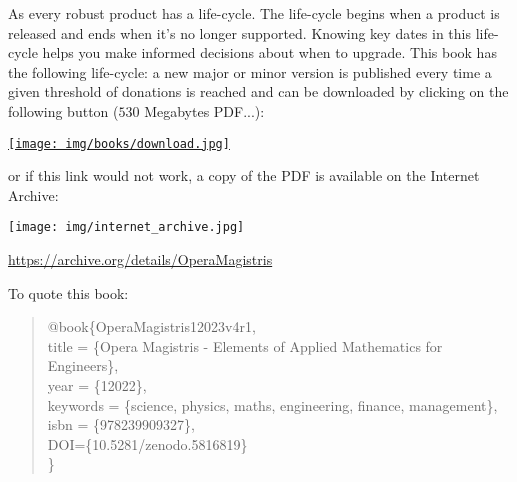 	As every robust product has a life-cycle. The life-cycle begins when a product is released and ends when it's no longer supported. Knowing key dates in this life-cycle helps you make informed decisions about when to upgrade. This book has the following life-cycle: a new major or minor version is published every time a given threshold of donations is reached and can be downloaded by clicking on the following button ($530$ Megabytes PDF...):
	\begin{center}
		\href{http://www.sciences.ch/htmlfr/php/cliccount/click.php?id=317}{\texttt{[image: img/books/download.jpg]}}
	\end{center}
	or if this link would not work, a copy of the PDF is available on the Internet Archive:
	\begin{center}
		\texttt{[image: img/internet\_archive.jpg]}
	\end{center}
	\begin{center}
	\href{https://archive.org/details/OperaMagistris}{https://archive.org/details/OperaMagistris}
	\end{center}

	To quote this book:
	\begin{quote}
	\noindent @book\{OperaMagistris12023v4r1, \\
		  title = \{Opera Magistris - Elements of Applied Mathematics for Engineers\}, \\
		  year = \{12022\}, \\
		  keywords = \{science, physics, maths, engineering, finance, management\}, \\
		  isbn = \{978239909327\},\\
		  DOI=\{10.5281/zenodo.5816819\}\\
	\}
	\end{quote}